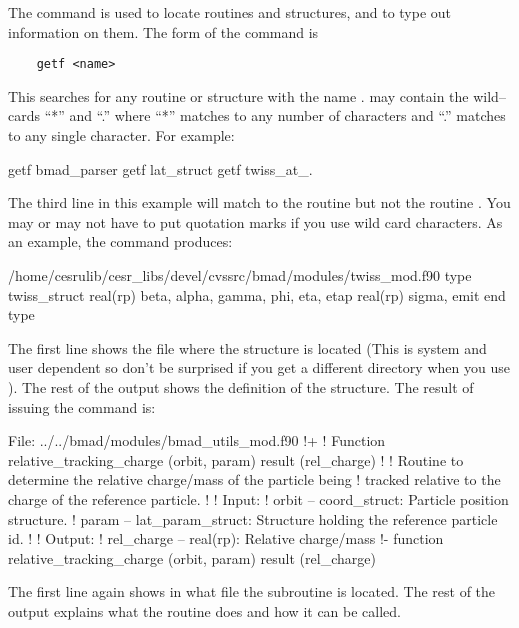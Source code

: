 {{{{{{The  command is used to locate routines and structures, and
to type out information on them.  The form of the command is
\begin{verbatim}
    getf <name>
\end{verbatim}
This searches for any routine or structure with the name
.  may contain the wild--cards ``*'' and ``.'' where
``*'' matches to any number of characters and ``.'' matches to any
single character. For example:
\begin{example}
    getf bmad_parser
    getf lat_struct
    getf twiss_at_.
\end{example}
The third line in this example will match to the routine
 but not the routine . You may or
may not have to put quotation marks if you use wild card characters.
As an example, the command  produces:
\begin{example}
  /home/cesrulib/cesr_libs/devel/cvssrc/bmad/modules/twiss_mod.f90
    type twiss_struct
      real(rp) beta, alpha, gamma, phi, eta, etap
      real(rp) sigma, emit
    end type
\end{example}
The first line shows the file where the structure is located (This is
system and user dependent so don't be surprised if you get a different
directory when you use ). The rest of the output shows the
definition of the  structure.  The result of issuing
the command  is:
\begin{example}
  File: ../../bmad/modules/bmad_utils_mod.f90
  !+
  ! Function relative_tracking_charge (orbit, param) result (rel_charge)
  !
  ! Routine to determine the relative charge/mass of the particle being
  ! tracked relative to the charge of the reference particle.
  !
  ! Input:
  !   orbit -- coord_struct: Particle position structure.
  !   param -- lat_param_struct: Structure holding the reference particle id.
  !
  ! Output:
  !   rel_charge -- real(rp): Relative charge/mass
  !-
  function relative_tracking_charge (orbit, param) result (rel_charge)
\end{example}
The first line again shows in what file the subroutine is located. The rest of the output explains
what the routine does and how it can be called.

}}}}}}
